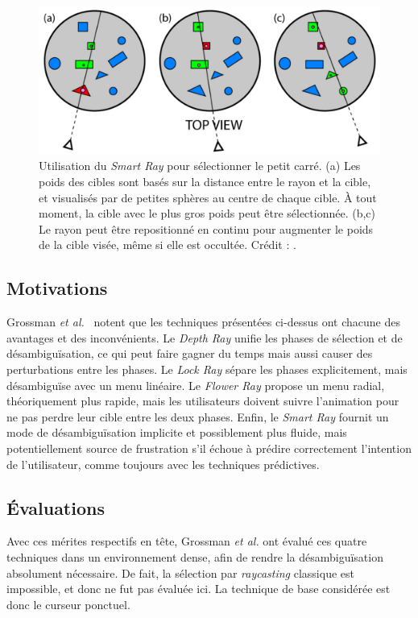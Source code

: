 	\begin{figure}[H]
		\centering
		\includegraphics[width=\textwidth]{figures/ch2/smartRay}
		\caption[Principe du \emph{Smart Ray}]{Utilisation du \emph{Smart Ray} pour sélectionner le petit carré. (a) Les poids des cibles sont basés sur la distance entre le rayon et la cible, et visualisés par de petites sphères au centre de chaque cible. À tout moment, la cible avec le plus gros poids peut être sélectionnée. (b,c) Le rayon peut être repositionné en continu pour augmenter le poids de la cible visée, même si elle est occultée. Crédit : \cite{grossman2006design}.}
		\label{fig:smartRay}
	\end{figure}
	
	\subsection{Motivations}
	Grossman \emph{et al.}~\cite{grossman2006design} notent que les techniques présentées ci-dessus ont chacune des avantages et des inconvénients. Le \emph{Depth Ray} unifie les phases de sélection et de désambiguïsation, ce qui peut faire gagner du temps mais aussi causer des perturbations entre les phases. Le \emph{Lock Ray} sépare les phases explicitement, mais désambiguïse avec un menu linéaire. Le \emph{Flower Ray} propose un menu radial, théoriquement plus rapide, mais les utilisateurs doivent suivre l'animation pour ne pas perdre leur cible entre les deux phases. Enfin, le \emph{Smart Ray} fournit un mode de désambiguïsation implicite et possiblement plus fluide, mais potentiellement source de frustration s'il échoue à prédire correctement l'intention de l'utilisateur, comme toujours avec les techniques prédictives.
	
	\subsection{Évaluations}
	Avec ces mérites respectifs en tête, Grossman \emph{et al.} ont évalué ces quatre techniques dans un environnement dense, afin de rendre la désambiguïsation absolument nécessaire. De fait, la sélection par \emph{raycasting} classique est impossible, et donc ne fut pas évaluée ici. La technique de base considérée est donc le curseur ponctuel.

